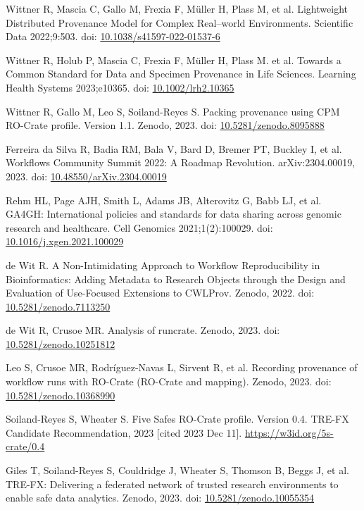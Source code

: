 \documentclass[10pt,letterpaper]{article}
\begin{document}
\begin{thebibliography}{10}
\begin{small}
Wittner R, Mascia C, Gallo M, Frexia F, Müller H, Plass M, et al.
Lightweight Distributed Provenance Model for Complex Real--world Environments.
Scientific Data 2022;9:503.
doi: \href{https://doi.org/10.1038/s41597-022-01537-6}{10.1038/s41597-022-01537-6}

Wittner R, Holub P, Mascia C, Frexia F, Müller H, Plass M. et al.
Towards a Common Standard for Data and Specimen Provenance in Life Sciences.
Learning Health Systems 2023;e10365.
doi: \href{https://doi.org/10.1002/lrh2.10365}{10.1002/lrh2.10365}

Wittner R, Gallo M, Leo S, Soiland-Reyes S.
Packing provenance using CPM RO-Crate profile. Version 1.1.
Zenodo, 2023.
doi: \href{https://doi.org/10.5281/zenodo.8095888}{10.5281/zenodo.8095888}

Ferreira da Silva R, Badia RM, Bala V, Bard D, Bremer PT, Buckley I, et al.
Workflows Community Summit 2022: A Roadmap Revolution.
arXiv:2304.00019, 2023.
doi: \href{https://doi.org/10.48550/arXiv.2304.00019}{10.48550/arXiv.2304.00019}

Rehm HL, Page AJH, Smith L, Adams JB, Alterovitz G, Babb LJ, et al.
GA4GH: International policies and standards for data sharing across genomic research and healthcare.
Cell Genomics 2021;1(2):100029.
doi: \href{https://doi.org/10.1016/j.xgen.2021.100029}{10.1016/j.xgen.2021.100029}

de Wit R.
A Non-Intimidating Approach to Workflow Reproducibility in Bioinformatics: Adding Metadata to Research Objects through the Design and Evaluation of Use-Focused Extensions to CWLProv.
Zenodo, 2022.
doi: \href{https://doi.org/10.5281/zenodo.7113250}{10.5281/zenodo.7113250}

de Wit R, Crusoe MR.
Analysis of runcrate.
Zenodo, 2023.
doi: \href{https://doi.org/10.5281/zenodo.10251812}{10.5281/zenodo.10251812}

Leo S, Crusoe MR, Rodríguez-Navas L, Sirvent R, et al.
Recording provenance of workflow runs with RO-Crate (RO-Crate and mapping).
Zenodo, 2023.
doi: \href{https://doi.org/10.5281/zenodo.10368990}{10.5281/zenodo.10368990}

Soiland-Reyes S, Wheater S.
Five Safes RO-Crate profile. Version 0.4.
TRE-FX Candidate Recommendation, 2023 [cited 2023 Dec 11].
\url{https://w3id.org/5s-crate/0.4}

Giles T, Soiland-Reyes S, Couldridge J, Wheater S, Thomson B, Beggs J, et al.
TRE-FX: Delivering a federated network of trusted research environments to enable safe data analytics.
Zenodo, 2023.
doi: \href{https://doi.org/10.5281/zenodo.10055354}{10.5281/zenodo.10055354}


\end{small}
\end{thebibliography}
\end{document}
